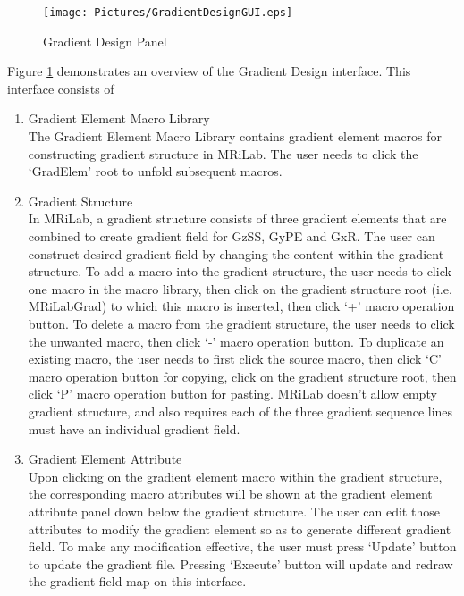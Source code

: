 \documentclass{book}%
\begin{document}
\begin{figure}[htbp]
	\centering
		\texttt{[image: Pictures/GradientDesignGUI.eps]}
	\caption{Gradient Design Panel}
	\label{fig:GradientDesignGUI}
\end{figure}

Figure \ref{fig:GradientDesignGUI} demonstrates an overview of the Gradient Design interface. This interface consists of 


\begin{enumerate}
	\item Gradient Element Macro Library \\
	
The Gradient Element Macro Library contains gradient element macros for constructing gradient structure in MRiLab. The user needs to click the `GradElem' root to unfold subsequent macros.

	\item Gradient Structure \\
	
In MRiLab, a gradient structure consists of three gradient elements that are combined to create gradient field for GzSS, GyPE and GxR. The user can construct desired gradient field by changing the content within the gradient structure. To add a macro into the gradient structure, the user needs to click one macro in the macro library, then click on the gradient structure root (i.e. MRiLabGrad) to which this macro is inserted, then click `+' macro operation button. To delete a macro from the gradient structure, the user needs to click the unwanted macro, then click `-' macro operation button. To duplicate an existing macro, the user needs to first click the source macro, then click `C' macro operation button for copying, click on the gradient structure root, then click `P' macro operation button for pasting. MRiLab doesn't allow empty gradient structure, and also requires each of the three gradient sequence lines must have an individual gradient field.	
	
	\item Gradient Element Attribute \\
	
Upon clicking on the gradient element macro within the gradient structure, the corresponding macro attributes will be shown at the gradient element attribute panel down below the gradient structure. The user can edit those attributes to modify the gradient element so as to generate different gradient field. To make any modification effective, the user must press `Update' button to update the gradient file. Pressing `Execute' button will update and redraw the gradient field map on this interface.		
	

\end{enumerate}
\end{document}
